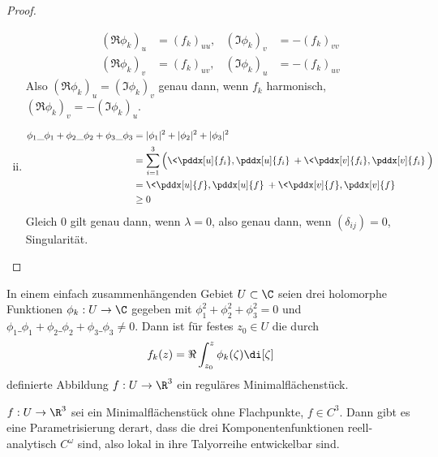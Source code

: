\begin{st}
\begin{proof}
\begin{enumerate}[(i)]
\begin{align*}
					(\Re \phi_k)_u &= (f_k)_{uu}, & (\Im \phi_k)_v &= - (f_k)_{vv} \\
					(\Re \phi_k)_v &= (f_k)_{uv}, & (\Im \phi_k)_u &= - (f_k)_{uv}
				\end{align*}
				Also $(\Re \phi_k)_u = (\Im \phi_k)_v$ genau dann, wenn $f_k$ harmonisch, $(\Re \phi_k)_v = -(\Im \phi_k)_u$.
			\item
				\begin{align*}
					\phi_1 \_\phi_1 + \phi_2 \_\phi_2 + \phi_3 \_\phi_3
					&= |\phi_1|^2 + |\phi_2|^2 + |\phi_3|^2 \\
					&= \sum_{i=1}^3 \Big( \<\pddx[u]{f_i}, \pddx[u]{f_i} \> + \<\pddx[v]{f_i}, \pddx[v]{f_i} \> \Big) \\
					&= \< \pddx[u]{f}, \pddx[u]{f} \> + \< \pddx[v]{f}, \pddx[v]{f} \> \\
					&\ge 0
				\end{align*}
				Gleich 0 gilt genau dann, wenn $\lambda = 0$, also genau dann, wenn $(\delta_{ij}) = 0$, Singularität.
		\end{enumerate}
	\end{proof}
\end{st}

\begin{kor}
	In einem einfach zusammenhängenden Gebiet $U \subset \C$ seien drei holomorphe Funktionen $\phi_k: U \to \C$ gegeben mit $\phi_1^2 + \phi_2^2 + \phi_3^2 = 0$ und $\phi_1\_\phi_1 + \phi_2 \_\phi_2 + \phi_3 \_\phi_3 \neq 0$.
	Dann ist für festes $z_0 \in U$ die durch
	\[
		f_k(z) = \Re \int_{z_0}^z \phi_k(\zeta) \di[\zeta]
	\]
	definierte Abbildung $f: U \to \R^3$ ein reguläres Minimalflächenstück.
\end{kor}

\begin{kor}
	$f: U \to \R^3$ sei ein Minimalflächenstück ohne Flachpunkte, $f \in C^3$.
	Dann gibt es eine Parametrisierung derart, dass die drei Komponentenfunktionen reell-analytisch $C^\omega$ sind, also lokal in ihre Talyorreihe entwickelbar sind.
\end{kor}

